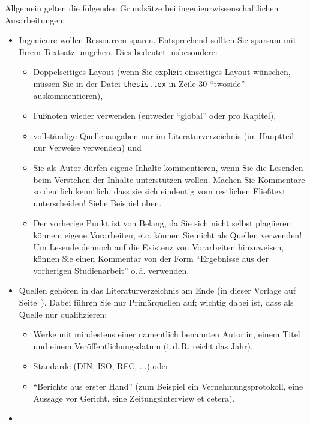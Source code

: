 \noindent Allgemein gelten die folgenden Grundsätze bei ingenieurwissenschaftlichen Ausarbeitungen:
\begin{itemize}
    \item{
        Ingenieure wollen Ressourcen sparen. Entsprechend sollten Sie sparsam mit Ihrem Textsatz umgehen. Dies bedeutet insbesondere:
        \begin{itemize}
            \item Doppelseitiges Layout (wenn Sie explizit einseitiges Layout wünschen, müssen Sie in der Datei \texttt{thesis.tex} in Zeile $30$ \enquote{twoside} auskommentieren),
            \item Fußnoten wieder verwenden (entweder \enquote{global} oder pro Kapitel),
            \item vollständige Quellenangaben nur im Literaturverzeichnis (im Hauptteil nur Verweise verwenden) und
            \item Sie als Autor dürfen eigene Inhalte kommentieren, wenn Sie die Lesenden beim Verstehen der Inhalte unterstützen wollen. Machen Sie Kommentare so deutlich kenntlich, dass sie sich eindeutig vom restlichen Fließtext unterscheiden! Siehe Beispiel oben.
            \item Der vorherige Punkt ist von Belang, da Sie sich nicht selbst plagiieren können; eigene Vorarbeiten, etc. können Sie nicht als Quellen verwenden! Um Lesende dennoch auf die Existenz von Vorarbeiten hinzuweisen, können Sie einen Kommentar von der Form \enquote{Ergebnisse aus der vorherigen Studienarbeit} o.\,ä. verwenden.
        \end{itemize}
    }
    \item{
        Quellen gehören in das Literaturverzeichnis am Ende (in dieser Vorlage auf Seite~\pageref{Bibliography}). Dabei führen Sie nur Primärquellen auf; wichtig dabei ist, dass als Quelle nur qualifizieren:
        \begin{itemize}
            \item Werke mit mindestens einer namentlich benannten Autor:in, einem Titel und einem Veröffentlichungsdatum (i.\,d.\,R. reicht das Jahr),
            \item Standarde (DIN, ISO, RFC, $\ldots$) oder
            \item \enquote{Berichte aus erster Hand} (zum Beispiel ein Vernehmungsprotokoll, eine Aussage vor Gericht, eine Zeitungsinterview et cetera).
        \end{itemize}
    }
    \item{
}
\end{itemize}
